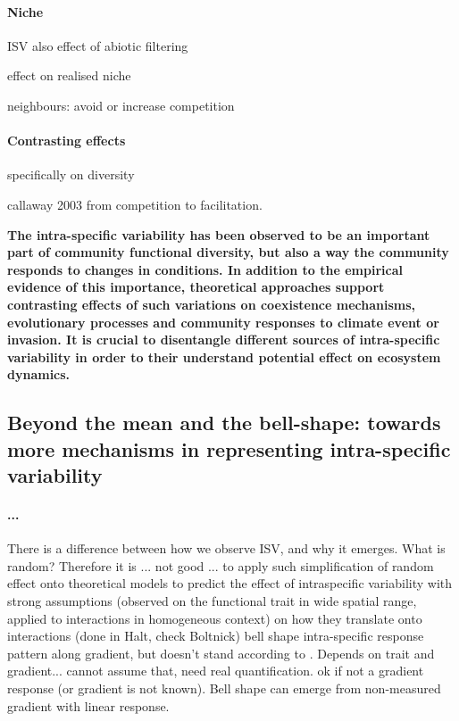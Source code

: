 {\paragraph{Niche}


ISV also 
effect of abiotic filtering

effect on realised niche

neighbours: avoid or increase competition


\paragraph{Contrasting effects}

specifically on diversity

callaway 2003 from competition to facilitation.

\cite{bolnick_why_2011}
\parencite{hart_how_2016}
\parencite{courbaud_intra-specific_2010}
\parencite{turcotte_phenotypic_2016}
\parencite{roscher_contrasting_2015}
\parencite{valladares_species_2015}
\parencite{barabas_effect_2016}
\parencite{jung_intraspecific_2010}

\textbf{The intra-specific variability has been observed to be an important part of community functional diversity, but also a way the community responds to changes in conditions. In addition to the empirical evidence of this importance, theoretical approaches support contrasting effects of such variations on coexistence mechanisms, evolutionary processes and community responses to climate event or invasion. It is crucial to disentangle different sources of intra-specific variability in order to their understand potential effect on ecosystem dynamics.}

\subsection{Beyond the mean and the bell-shape: towards more mechanisms in representing intra-specific variability}\label{subsection:bell-shape}

\paragraph{...}
There is a difference between how we observe ISV, and why it emerges. What is random? Therefore it is  ... not good ... to apply such simplification of random effect onto theoretical models to predict the effect of intraspecific variability with strong assumptions (observed on the functional trait in wide spatial range, applied to interactions in homogeneous context) on how they translate onto interactions (done in Halt, check Boltnick) 
\cite{albert_intraspecific_2010} bell shape intra-specific response pattern along gradient, but doesn't stand according to \cite{kichenin_contrasting_2013}. Depends on trait and gradient... cannot assume that, need real quantification. ok if not a gradient response (or gradient is not known).
Bell shape can emerge from non-measured gradient with linear response. 

}
